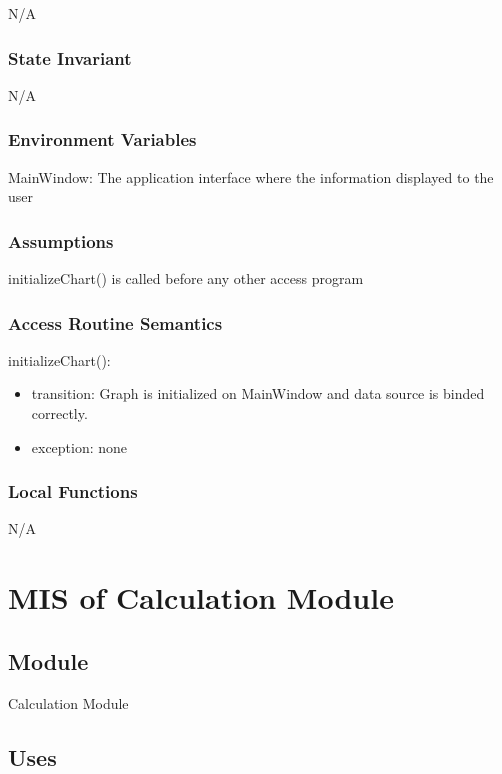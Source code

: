 \documentclass[12pt, titlepage]{article}
\begin{document}
N/A

\subsubsection{State Invariant}

N/A

\subsubsection{Environment Variables}

MainWindow: The application interface where the information displayed to the user

\subsubsection{Assumptions}

initializeChart() is called before any other access program

\subsubsection{Access Routine Semantics}

\noindent initializeChart():
\begin{itemize}
\item transition: Graph is initialized on MainWindow and data source is binded correctly.
\item exception: none
\end{itemize}

\subsubsection{Local Functions}

N/A

\newpage


\section{MIS of Calculation Module} \label{C} 

\subsection{Module}

Calculation Module

\subsection{Uses}
\end{document}
